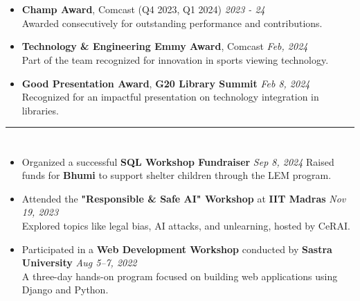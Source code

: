 \documentclass[a4paper,10pt]{article}
\begin{document}
\section{\scshape{}}
\begin{itemize}
    \item \textbf{Champ Award}, Comcast (Q4 2023, Q1 2024) \hfill \textit{2023 - 24}\\
    Awarded consecutively for outstanding performance and contributions.
    \vspace{-2mm}
    \item \textbf{Technology \& Engineering Emmy Award}, Comcast \href{https://corporate.comcast.com/press/releases/comcast-wins-technology-engineering-emmy-innovation-sports-viewing}{} \hfill \textit{Feb, 2024}\\
    Part of the team recognized for innovation in sports viewing technology. 
    \vspace{-2mm}
    \item \textbf{Good Presentation Award}, \textbf{G20 Library Summit} \href{https://www.linkedin.com/posts/a-shreehari_ml-huggingface-g20librarysummit-activity-7163032877201371137-ZS8n?utm_source=share&utm_medium=member_desktop}{} \hfill \textit{Feb 8, 2024}\\
    Recognized for an impactful presentation on technology integration in libraries.
\end{itemize}

\hrule
\section{\scshape\color{Fuchsia}{\faBookOpen \ \textbf WORKSHOPS}}
\begin{itemize}
    \item Organized a successful \textbf{SQL Workshop Fundraiser} \href{https://www.linkedin.com/posts/a-shreehari_fundraiser-sqlworkshop-communitysupport-activity-7239111496339746816-VhVM?utm_source=share&utm_medium=member_desktop}{} \hfill \textit{Sep 8, 2024} Raised funds for \textbf{Bhumi} to support shelter children through the LEM program.
    \vspace{-2mm}
    \item Attended the \textbf{"Responsible \& Safe AI" Workshop} at \textbf{IIT Madras} \href{https://www.linkedin.com/posts/activity-7132008217424916480-G6g2?utm_source=share&utm_medium=member_desktop}{} \hfill \textit{Nov 19, 2023} \\ 
    Explored topics like legal bias, AI attacks, and unlearning, hosted by CeRAI.
    \vspace{-2mm}
    \item Participated in a \textbf{Web Development Workshop} conducted by \textbf{Sastra University} \hfill \textit{Aug 5–7, 2022} \\
    A three-day hands-on program focused on building web applications using Django and Python.
\end{itemize}
\end{document}
